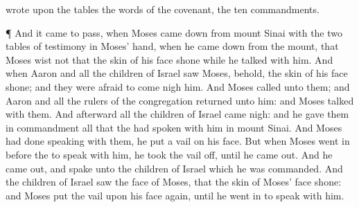 {wrote upon the
tables the
words of the
covenant, the
ten
commandments.
\par }{\PP {}¶ And it came to pass, when
Moses came
down from
mount
Sinai with the
two
tables of
testimony in
Moses’
hand, when he came
down from the
mount, that
Moses
wist not that the
skin of his
face
shone while he
talked with him.
And when
Aaron and all the
children of
Israel
saw
Moses, behold, the
skin of his
face
shone; and they were
afraid to come
nigh him.
And
Moses
called unto them; and
Aaron and all the
rulers of the
congregation
returned unto him: and
Moses
talked with them.
And
afterward all the
children of
Israel came
nigh: and he gave them in
commandment all that the
{} had
spoken with him in
mount
Sinai.
And
{}
Moses had
done
speaking with them, he
put a
vail on his
face.
But when
Moses went
in
before the
{} to
speak with him, he
took the
vail
off, until he came
out. And he came
out, and
spake unto the
children of
Israel
{} which he was
commanded.
And the
children of
Israel
saw the
face of
Moses, that the
skin of
Moses’
face
shone: and
Moses
put the
vail upon his
face
again, until he
went in to
speak with him.

}
